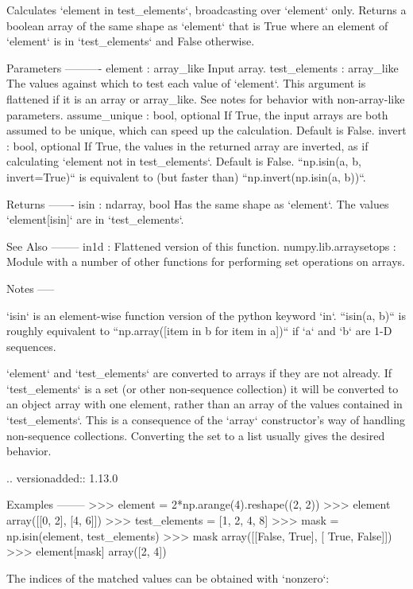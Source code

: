 \begin{DoxyVerb}Calculates `element in test_elements`, broadcasting over `element` only.
Returns a boolean array of the same shape as `element` that is True
where an element of `element` is in `test_elements` and False otherwise.

Parameters
----------
element : array_like
    Input array.
test_elements : array_like
    The values against which to test each value of `element`.
    This argument is flattened if it is an array or array_like.
    See notes for behavior with non-array-like parameters.
assume_unique : bool, optional
    If True, the input arrays are both assumed to be unique, which
    can speed up the calculation.  Default is False.
invert : bool, optional
    If True, the values in the returned array are inverted, as if
    calculating `element not in test_elements`. Default is False.
    ``np.isin(a, b, invert=True)`` is equivalent to (but faster
    than) ``np.invert(np.isin(a, b))``.

Returns
-------
isin : ndarray, bool
    Has the same shape as `element`. The values `element[isin]`
    are in `test_elements`.

See Also
--------
in1d                  : Flattened version of this function.
numpy.lib.arraysetops : Module with a number of other functions for
                        performing set operations on arrays.

Notes
-----

`isin` is an element-wise function version of the python keyword `in`.
``isin(a, b)`` is roughly equivalent to
``np.array([item in b for item in a])`` if `a` and `b` are 1-D sequences.

`element` and `test_elements` are converted to arrays if they are not
already. If `test_elements` is a set (or other non-sequence collection)
it will be converted to an object array with one element, rather than an
array of the values contained in `test_elements`. This is a consequence
of the `array` constructor's way of handling non-sequence collections.
Converting the set to a list usually gives the desired behavior.

.. versionadded:: 1.13.0

Examples
--------
>>> element = 2*np.arange(4).reshape((2, 2))
>>> element
array([[0, 2],
       [4, 6]])
>>> test_elements = [1, 2, 4, 8]
>>> mask = np.isin(element, test_elements)
>>> mask
array([[False,  True],
       [ True, False]])
>>> element[mask]
array([2, 4])

The indices of the matched values can be obtained with `nonzero`:


\end{DoxyVerb}

